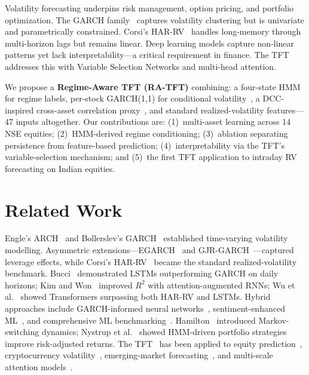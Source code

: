 \documentclass[runningheads]{llncs}
\begin{document}
Volatility forecasting underpins risk management, option pricing, and portfolio optimization. The GARCH family~\cite{bollerslev1986} captures volatility clustering but is univariate and parametrically constrained. Corsi's HAR-RV~\cite{corsi2009} handles long-memory through multi-horizon lags but remains linear. Deep learning models capture non-linear patterns yet lack interpretability---a critical requirement in finance. The TFT~\cite{lim2021} addresses this with Variable Selection Networks and multi-head attention.

We propose a \textbf{Regime-Aware TFT (RA-TFT)} combining: a four-state HMM~\cite{hamilton1989} for regime labels, per-stock GARCH(1,1) for conditional volatility~\cite{bollerslev1986}, a DCC-inspired cross-asset correlation proxy~\cite{engle1982}, and standard realized-volatility features---47 inputs altogether. Our contributions are: (1)~multi-asset learning across 14 NSE equities; (2)~HMM-derived regime conditioning; (3)~ablation separating persistence from feature-based prediction; (4)~interpretability via the TFT's variable-selection mechanism; and (5)~the first TFT application to intraday RV forecasting on Indian equities.

\section{Related Work}\label{sec:related}

Engle's ARCH~\cite{engle1982} and Bollerslev's GARCH~\cite{bollerslev1986} established time-varying volatility modelling. Asymmetric extensions---EGARCH~\cite{nelson1991} and GJR-GARCH~\cite{glosten1993}---captured leverage effects, while Corsi's HAR-RV~\cite{corsi2009} became the standard realized-volatility benchmark. Bucci~\cite{bucci2020} demonstrated LSTMs outperforming GARCH on daily horizons; Kim and Won~\cite{kim2022} improved $R^2$ with attention-augmented RNNs; Wu et al.~\cite{wu2023} showed Transformers surpassing both HAR-RV and LSTMs. Hybrid approaches include GARCH-informed neural networks~\cite{zhang2023}, sentiment-enhanced ML~\cite{rahimikia2023}, and comprehensive ML benchmarking~\cite{christensen2023}. Hamilton~\cite{hamilton1989} introduced Markov-switching dynamics; Nystrup et al.~\cite{nystrup2021} showed HMM-driven portfolio strategies improve risk-adjusted returns. The TFT~\cite{lim2021} has been applied to equity prediction~\cite{olorunnimbe2023}, cryptocurrency volatility~\cite{chen2024}, emerging-market forecasting~\cite{patel2024}, and multi-scale attention models~\cite{zhao2024}.
\end{document}
